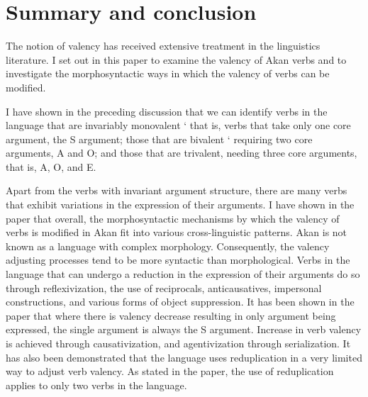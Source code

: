 \documentclass[output=paper]{langsci/langscibook}
\begin{document}
\ea
\label{ex:49.osam}
	\z

	\z
\z


\section{Summary and conclusion}\label{§7:summary.osam}

The notion of valency has received extensive treatment in the linguistics literature. I set out in this paper to examine the valency of Akan verbs and to investigate the morphosyntactic ways in which the valency of verbs can be modified. 

I have shown in the preceding discussion that we can identify verbs in the language that are invariably monovalent ` that is, verbs that take only one core argument, the S argument; those that are bivalent ` requiring two core arguments, A and O; and those that are trivalent, needing three core arguments, that is, A, O, and E.

Apart from the verbs with invariant argument structure, there are many verbs that exhibit variations in the expression of their arguments. I have shown in the paper that overall, the morphosyntactic mechanisms by which the valency of verbs is modified in Akan fit into various cross-linguistic patterns. Akan is not known as a language with complex morphology. Consequently, the valency adjusting processes tend to be more syntactic than morphological. Verbs in the language that can undergo a reduction in the expression of their arguments do so through reflexivization, the use of reciprocals, anticausatives, impersonal constructions, and various forms of object suppression. It has been shown in the paper that where there is valency decrease resulting in only argument being expressed, the single argument is always the S argument.  Increase in verb valency is achieved through causativization, and agentivization through serialization. It has also been demonstrated that the language uses reduplication in a very limited way to adjust verb valency. As stated in the paper, the use of reduplication applies to only two verbs in the language.
\end{document}
